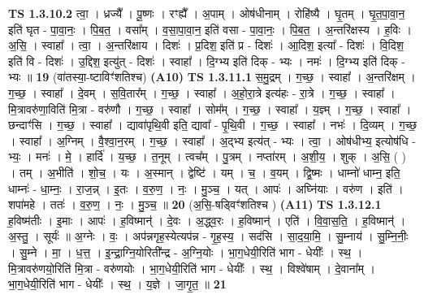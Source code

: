 \documentclass[17pt]{extarticle}
\begin{document}
                  \newline
                                \textbf{ TS 1.3.10.2} \newline
                  त्वा॒ । ध्रज्यै᳚ । पू॒ष्णः । रꣳह्यै᳚ । अ॒पाम् । ओष॑धीनाम् । रोहि॑ष्यै । घृ॒तम् । घृ॒त॒पा॒वा॒न॒ इति॑ घृत - पा॒वा॒नः॒ । पि॒ब॒त॒ । वसा᳚म् । व॒सा॒पा॒वा॒न॒ इति॑ वसा - पा॒वा॒नः॒ । पि॒ब॒त॒ । अ॒न्तरि॑क्षस्य । ह॒विः । अ॒सि॒ । स्वाहा᳚ । त्वा॒ । अ॒न्तरि॑क्षाय । दिशः॑ । प्र॒दिश॒ इति॑ प्र - दिशः॑ । आ॒दिश॒ इत्या᳚ - दिशः॑ । वि॒दिश॒ इति॑ वि - दिशः॑ । उ॒द्दिश॒ इत्यु॑त् - दिशः॑ । स्वाहा᳚ । दि॒ग्भ्य इति॑ दिक् - भ्यः । नमः॑ । दि॒ग्भ्य इति॑ दिक् - भ्यः ॥ \textbf{  19} \newline
                  \newline
                      (वा॑तस्या॒-ष्टाविꣳ॑शतिश्च)  \textbf{(A10)} \newline \newline
                                \textbf{ TS 1.3.11.1} \newline
                  स॒मु॒द्रम् । ग॒च्छ॒ । स्वाहा᳚ । अ॒न्तरि॑क्षम् । ग॒च्छ॒ । स्वाहा᳚ । दे॒वम् । स॒वि॒तार᳚म् । ग॒च्छ॒ । स्वाहा᳚ । अ॒हो॒रा॒त्रे इत्य॑हः - रा॒त्रे । ग॒च्छ॒ । स्वाहा᳚ । मि॒त्रावरु॑णा॒विति॑ मि॒त्रा - वरु॑णौ । ग॒च्छ॒ । स्वाहा᳚ । सोम᳚म् । ग॒च्छ॒ । स्वाहा᳚ । य॒ज्ञ्म् । ग॒च्छ॒ । स्वाहा᳚ । छन्दाꣳ॑सि । ग॒च्छ॒ । स्वाहा᳚ । द्यावा॑पृथि॒वी इति॒ द्यावा᳚ - पृ॒थि॒वी । ग॒च्छ॒ । स्वाहा᳚ । नभः॑ । दि॒व्यम् । ग॒च्छ॒ । स्वाहा᳚ । अ॒ग्निम् । वै॒श्वा॒न॒रम् । ग॒च्छ॒ । स्वाहा᳚ । अ॒द्भ्य इत्य॑त् - भ्यः । त्वा॒ । ओष॑धीभ्य॒ इत्योष॑धि - भ्यः॒ । मनः॑ । मे॒ । हार्दि॑ । य॒च्छ॒ । त॒नूम् । त्वच᳚म् । पु॒त्रम् । नप्ता॑रम् । अ॒शी॒य॒ । शुक् । अ॒सि॒ ( ) । तम् । अ॒भीति॑ । शो॒च॒ । यः । अ॒स्मान् । द्वेष्टि॑ । यम् । च॒ । व॒यम् । द्वि॒ष्मः । धाम्नो॑ धाम्न॒ इति॒ धाम्नः॑ - धा॒म्नः॒ । रा॒ज॒न्न् । इ॒तः । व॒रु॒ण॒ । नः॒ । मु॒ञ्च॒ । यत् । आपः॑ । अघ्नि॑याः । वरु॑ण । इति॑ । शपा॑महे । ततः॑ । व॒रु॒ण॒ । नः॒ । मु॒ञ्च॒ ॥ \textbf{  20 } \newline
                  \newline
                      (अ॒सि॒-षड्विꣳ॑शतिश्च )  \textbf{(A11)} \newline \newline
                                \textbf{ TS 1.3.12.1} \newline
                  ह॒विष्म॑तीः । इ॒माः । आपः॑ । ह॒विष्मान्॑ । दे॒वः । अ॒द्ध्व॒रः । ह॒विष्मान्॑ । एति॑ । वि॒वा॒स॒ति॒ । ह॒विष्मान्॑ । अ॒स्तु॒ । सूर्यः॑ ॥ अ॒ग्नेः । वः॒ । अप॑न्नगृह॒स्येत्यप॑न्न - गृ॒ह॒स्य॒ । सद॑सि । सा॒द॒या॒मि॒ । सु॒म्नाय॑ । सु॒म्नि॒नीः॒ । सु॒म्ने । मा॒ । ध॒त्त॒ । इ॒न्द्रा॒ग्नि॒योरिती᳚न्द्र - अ॒ग्नि॒योः । भा॒ग॒धेयी॒रिति॑ भाग - धेयीः᳚ । स्थ॒ । मि॒त्रावरु॑णयो॒रिति॑ मि॒त्रा - वरु॑णयोः । भा॒ग॒धेयी॒रिति॑ भाग - धेयीः᳚ । स्थ॒ । विश्वे॑षाम् । दे॒वाना᳚म् । भा॒ग॒धेयी॒रिति॑ भाग - धेयीः᳚ । स्थ॒ । य॒ज्ञे । जा॒गृ॒त॒ ॥ \textbf{  21 } \newline
\end{document}
